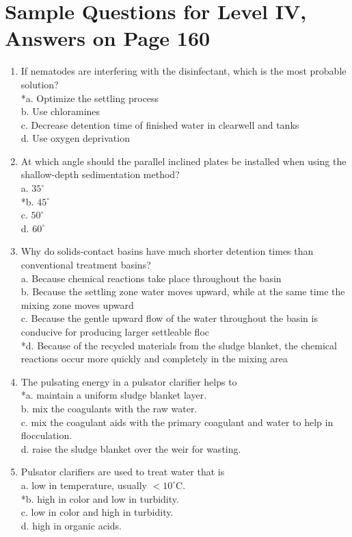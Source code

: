 \section{Sample Questions for Level IV, Answers on Page 160}
\begin{enumerate}[label=TIV-\arabic*]
  \item If nematodes are interfering with the disinfectant, which is the most probable solution?\\
*a. Optimize the settling process\\
b. Use chloramines\\
c. Decrease detention time of finished water in clearwell and tanks\\
d. Use oxygen deprivation\\
  \item At which angle should the parallel inclined plates be installed when using the shallow-depth sedimentation method?\\
a. $35^{\circ}$\\
*b. $45^{\circ}$\\
c. $50^{\circ}$\\
d. $60^{\circ}$\\
  \item Why do solids-contact basins have much shorter detention times than conventional treatment basins?\\
a. Because chemical reactions take place throughout the basin\\
b. Because the settling zone water moves upward, while at the same time the mixing zone moves upward\\
c. Because the gentle upward flow of the water throughout the basin is conducive for producing larger settleable floc\\
*d. Because of the recycled materials from the sludge blanket, the chemical reactions occur more quickly and completely in the mixing area\\
  \item The pulsating energy in a pulsator clarifier helps to\\
*a. maintain a uniform sludge blanket layer.\\
b. mix the coagulants with the raw water.\\
c. mix the coagulant aids with the primary coagulant and water to help in flocculation.\\
d. raise the sludge blanket over the weir for wasting.\\
  \item Pulsator clarifiers are used to treat water that is\\
a. low in temperature, usually $<10^{\circ} \mathrm{C}$.\\
*b. high in color and low in turbidity.\\
c. low in color and high in turbidity.\\
d. high in organic acids.\\
\end{enumerate}
